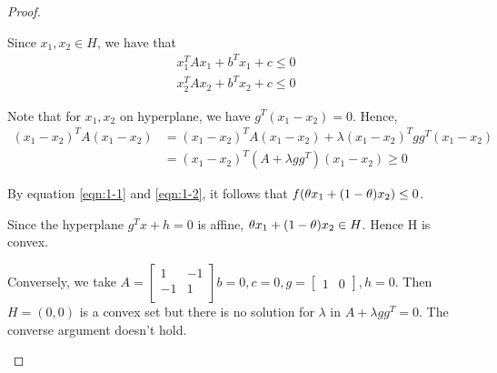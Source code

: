 \begin{proof}
\begin{enumerate}
{Since $x_1,x_2 \in H$, we have that
\begin{equation}
\begin{aligned}
x_1^T A x_1 + b^T x_1 + c \leq 0 \\
x_2^T A x_2 + b^T x_2 + c \leq 0
\end{aligned}
\label{eqn:1-1}
\end{equation}

Note that for $x_1, x_2$ on hyperplane, we have $ g^{T} (x_1 - x_2) = 0 $. Hence,
\begin{equation}
\begin{aligned}
(x_1-x_2)^T A (x_1-x_2) &= (x_1-x_2)^T A (x_1-x_2) + \lambda (x_1 - x_2)^T g g^T (x_1 - x_2) \\
&= (x_1-x_2)^T (A+\lambda g g^T) (x_1-x_2) \geq 0
\end{aligned}
\label{eqn:1-2}
\end{equation}

By equation \ref{eqn:1-1} and \ref{eqn:1-2}, it follows that $f(\theta x_1 + (1-\theta) x_2) \leq 0$.

Since the hyperplane $g^{T} x+h=0$ is affine, $\theta x_1 + (1-\theta) x_2 \in H$. Hence H is convex.

Conversely, we take $A = \begin{bmatrix}
1 &-1 \\
-1& 1\\
\end{bmatrix} b = 0, c = 0, g = \begin{bmatrix}
1 & 0 
\end{bmatrix}, h = 0
$.
Then $H = {(0,0)}$ is a convex set but there is no solution for $\lambda$ in $A + \lambda g g^T = 0$. The converse argument doesn't hold.
}
\end{enumerate}
\end{proof}

